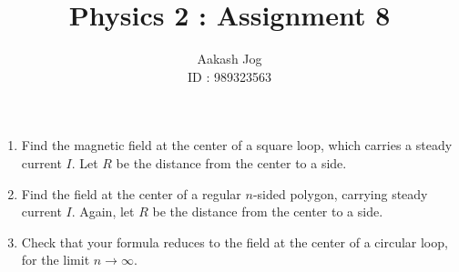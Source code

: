 \documentclass[fleqn, a4paper, 11pt, oneside]{amsart}
\title{Physics 2 : Assignment 8}
\author
{
	Aakash Jog\\
	ID : 989323563
}
\date{\formatdate{20}{5}{2015}}
\theoremstyle{definition}
\theoremstyle{theorem}
\begin{document}
\maketitle

\begin{question}
	\begin{enumerate}
		\item
			Find the magnetic field at the center of a square loop, which carries a steady current $I$.
			Let $R$ be the distance from the center to a side.
		\item
			Find the field at the center of a regular $n$-sided polygon, carrying steady current $I$.
			Again, let $R$ be the distance from the center to a side.
		\item
			Check that your formula reduces to the field at the center of a circular loop, for the limit $n \to \infty$.
	\end{enumerate}
\end{question}
\end{document}
